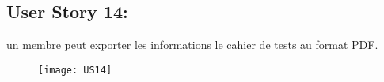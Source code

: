 
\subsection{User Story 14:}
un membre peut exporter les informations le cahier de tests au format PDF.


\begin{figure}[!h]
  \begin{center}
        \texttt{[image: US14]}
        \label{US14-dia}
  \end{center}
\end{figure}